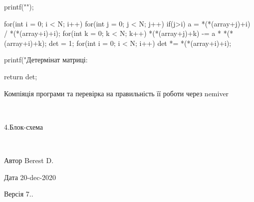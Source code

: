 \begin{DoxyEnumerate}
\begin{DoxyVerb}
{         printf("\n\n");

         for(int i = 0; i < N; i++)
         {
             for(int j = 0; j < N; j++)
             {
                 if(j>i)
                 {
                     a = *(*(array+j)+i) / *(*(array+i)+i);
                     for(int k = 0; k < N; k++)
                     {
                         *(*(array+j)+k) -= a * *(*(array+i)+k);
                     }
                 }
             }
         }
         det = 1;
         for(int i = 0; i < N; i++)
         {
             det *= *(*(array+i)+i);
         }

         printf("Детермінат матриці: %

     return det;
     }
\end{DoxyVerb}

\item Компіяція програми та перевірка на правильність її роботи через nemiver
\end{DoxyEnumerate}

 ~\newline


4.Блок-\/схема

 ~\newline


\begin{DoxyAuthor}{Автор}
Berest D. 
\end{DoxyAuthor}
\begin{DoxyDate}{Дата}
20-\/dec-\/2020 
\end{DoxyDate}
\begin{DoxyVersion}{Версія}
7.. 
\end{DoxyVersion}
